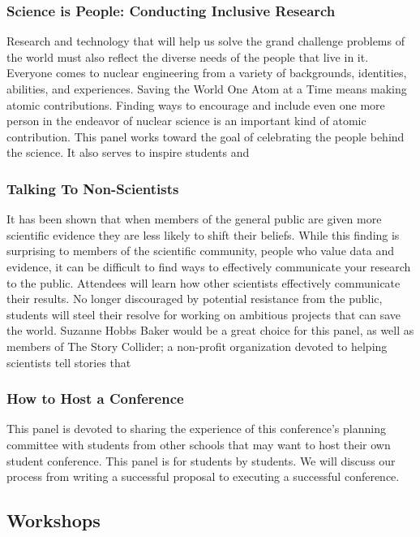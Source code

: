 \subsubsection{Science is People: Conducting Inclusive Research}
Research and technology that will help us solve the grand challenge problems of the world must also reflect the diverse needs of the people that live in it. Everyone comes to nuclear engineering from a variety of backgrounds, identities, abilities, and experiences. Saving the World One Atom at a Time means making atomic contributions. Finding ways to encourage and include even one more person in the endeavor of nuclear science is an important kind of atomic contribution. This panel works toward the goal of celebrating the people behind the science. It also serves to inspire students and 

\subsubsection{Talking To Non-Scientists}
It has been shown that when members of the general public are given more scientific evidence they are less likely to shift their beliefs. While this finding is surprising to members of the scientific community, people who value data and evidence, it can be difficult to find ways to effectively communicate your research to the public. Attendees will learn how other scientists effectively communicate their results. No longer discouraged by potential resistance from the public, students will steel their resolve for working on ambitious projects that can save the world. Suzanne Hobbs Baker would be a great choice for this panel, as well as members of The Story Collider; a non-profit organization devoted to helping scientists tell stories that 

\subsubsection{How to Host a Conference}
This panel is devoted to sharing the experience of this conference's planning committee with students from other schools that may want to host their own student conference. This panel is for students by students. We will discuss our process from writing a successful proposal to executing a successful conference. 


\subsection{Workshops}

